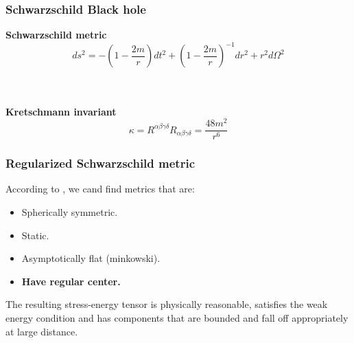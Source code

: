 \documentclass{beamer}
\begin{document}

\begin{frame}[fragile] %
\frametitle{Schwarzschild Black hole}

\textbf{Schwarzschild metric}
\begin{equation}
\label{sch}
ds^2 = -\left(1 - \frac{2m}{r} \right) dt^2 + \left(1 - \frac{2m}{r} \right)^{-1}dr^2 + r^2d\Omega ^2
\end{equation}

\
\\
\
\\

\textbf{Kretschmann invariant}
\begin{equation}
\label{kret}
\kappa = R^{\alpha \beta \gamma \delta} R_{\alpha \beta \gamma \delta} = \frac{48m^2}{r^6}
\end{equation}

\end{frame}


\begin{frame}
\frametitle{Regularized Schwarzschild metric}
According to \cite{hayward}, we cand find metrics that are:

\begin{itemize}
\item Spherically symmetric.
\item Static.
\item Asymptotically flat (minkowski).
\item \textbf{Have regular center.}
\end{itemize}

The resulting stress-energy tensor is physically reasonable, satisfies the weak energy condition and has components that are bounded and fall off appropriately at large distance.



\end{frame}




\end{document}
